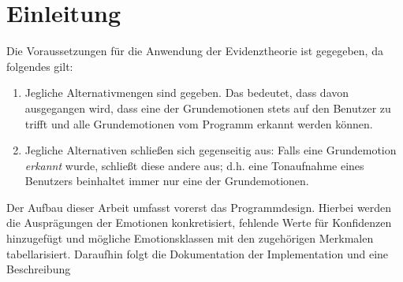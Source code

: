 \chapter{Einleitung}
Die Voraussetzungen für die Anwendung der Evidenztheorie ist gegegeben, da folgendes gilt:

\begin{enumerate}
  \item Jegliche Alternativmengen sind gegeben. Das bedeutet, dass davon ausgegangen wird, dass eine der Grundemotionen stets auf den Benutzer zu trifft und alle Grundemotionen vom Programm erkannt werden können. 
  \item Jegliche Alternativen schließen sich gegenseitig aus: Falls eine Grundemotion \textit{erkannt} wurde, schließt diese andere aus; d.h. eine Tonaufnahme eines Benutzers beinhaltet immer nur eine der Grundemotionen.
\end{enumerate}

Der Aufbau dieser Arbeit umfasst vorerst das Programmdesign. Hierbei werden die Ausprägungen der Emotionen konkretisiert, fehlende Werte für Konfidenzen hinzugefügt und mögliche Emotionsklassen mit den zugehörigen Merkmalen tabellarisiert. Daraufhin folgt die Dokumentation der Implementation und eine Beschreibung 